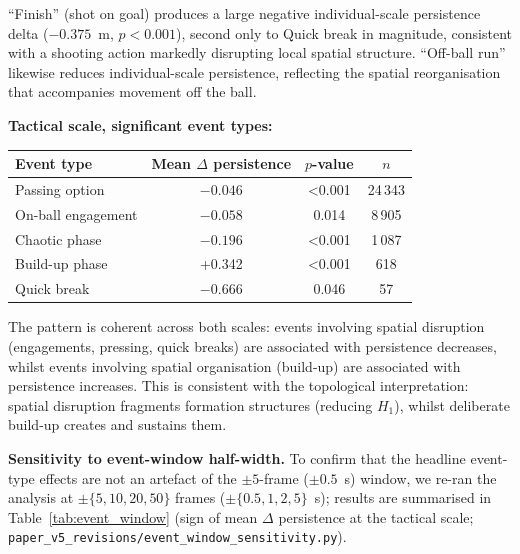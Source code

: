 ``Finish'' (shot on goal) produces a large negative individual-scale persistence delta ($-0.375$~m, $p<0.001$), second only to Quick break in magnitude, consistent with a shooting action markedly disrupting local spatial structure. ``Off-ball run'' likewise reduces individual-scale persistence, reflecting the spatial reorganisation that accompanies movement off the ball.

\textbf{Tactical scale, significant event types:}

\begin{table}[H]
  \centering
  \begin{tabular}{@{}lccc@{}}
    \toprule
    Event type & Mean \(\Delta\) persistence & \(p\)-value & \(n\) \\
    \midrule
    Passing option     & \(-0.046\) & \textless0.001 & 24\,343 \\
    On-ball engagement & \(-0.058\) & 0.014 & 8\,905 \\
    Chaotic phase      & \(-0.196\) & \textless0.001 & 1\,087 \\
    Build-up phase     & +0.342 & \textless0.001 & 618 \\
    Quick break        & \(-0.666\) & 0.046 & 57 \\
    \bottomrule
  \end{tabular}
\end{table}

The pattern is coherent across both scales: events involving spatial disruption (engagements, pressing, quick breaks) are associated with persistence decreases, whilst events involving spatial organisation (build-up) are associated with persistence increases. This is consistent with the topological interpretation: spatial disruption fragments formation structures (reducing \(H_1\)), whilst deliberate build-up creates and sustains them.

\textbf{Sensitivity to event-window half-width.} To confirm that the headline event-type effects are not an artefact of the \(\pm 5\)-frame ($\pm 0.5$~s) window, we re-ran the analysis at \(\pm \{5, 10, 20, 50\}\) frames ($\pm \{0.5, 1, 2, 5\}$~s); results are summarised in Table~\ref{tab:event_window} (sign of mean \(\Delta\) persistence at the tactical scale; \texttt{paper\_v5\_revisions/event\_window\_sensitivity.py}).


